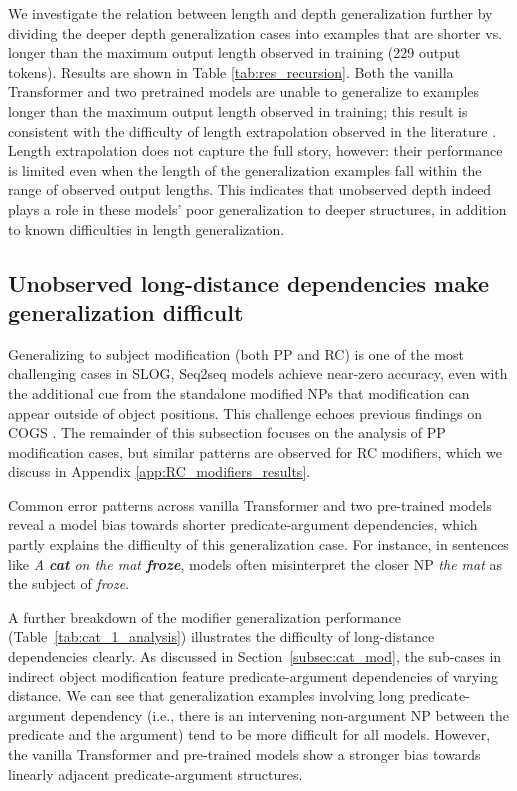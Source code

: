 We investigate the relation between length and depth generalization further by dividing the deeper depth generalization cases into examples that are shorter vs. longer than the maximum output length observed in training (229 output tokens). Results are shown in Table \ref{tab:res_recursion}. Both the vanilla Transformer and two pretrained  models are unable to generalize to examples longer than the maximum output length observed in training; this result is consistent with the difficulty of length extrapolation observed in the literature \citep{hupkes2020compositionality,anil2022exploring}. Length extrapolation does not capture the full story, however: their performance is limited even when the length of the generalization examples fall within the range of observed output lengths. This indicates that unobserved depth indeed plays a role in these models' poor generalization to deeper structures, in addition to known difficulties in length generalization.

\subsection{Unobserved long-distance dependencies make generalization difficult} \label{subsec:long_distance_hard}


Generalizing to subject modification (both PP and RC) is one of the most challenging cases in SLOG, Seq2seq models achieve near-zero accuracy, even with the additional cue from the standalone modified NPs that modification can appear outside of object positions. This challenge echoes previous findings on COGS \citep{akyurek-andreas-2021-lexicon,zheng-lapata-2022-disentangled,yao-koller-2022-structural}. The remainder of this subsection focuses on the analysis of PP modification cases, but similar patterns are observed for RC modifiers, which we discuss in Appendix \ref{app:RC_modifiers_results}.

Common error patterns across vanilla Transformer and two pre-trained models reveal a model bias towards shorter predicate-argument dependencies, which partly explains the difficulty of this generalization case. For instance, in sentences like \textit{A {\bf cat} on the mat {\bf froze}}, models often misinterpret the closer NP \textit{the mat} as the subject of \textit{froze}.

A further breakdown of the modifier generalization performance (Table~\ref{tab:cat_1_analysis}) illustrates the difficulty of long-distance dependencies clearly. As discussed in Section~\ref{subsec:cat_mod}, the sub-cases in indirect object modification feature predicate-argument dependencies of varying distance. We can see that generalization examples involving long predicate-argument dependency (i.e., there is an intervening non-argument NP between the predicate and the argument) tend to be more difficult for all models. However, the vanilla Transformer and pre-trained models show a stronger bias towards linearly adjacent predicate-argument structures.

